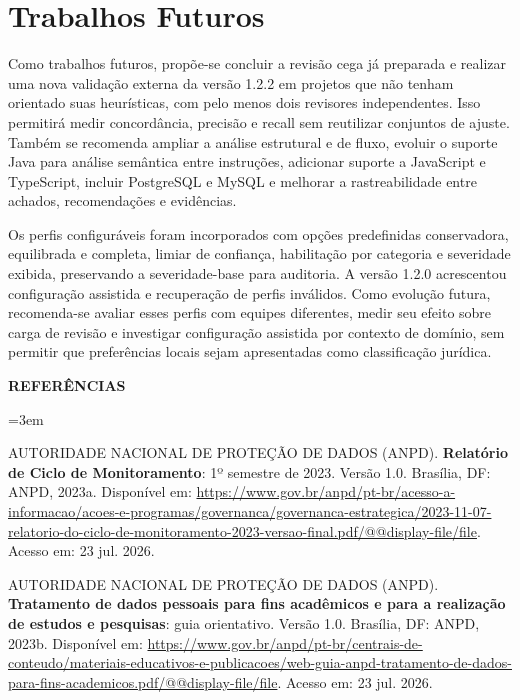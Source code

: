 \documentclass[12pt,a4paper,oneside]{report}
\newcommand{\tituloref}[1]{\textbf{#1}}
\begin{document}
\section{Trabalhos Futuros}

Como trabalhos futuros, propõe-se concluir a revisão cega já preparada e realizar uma nova validação externa da versão 1.2.2 em projetos que não tenham orientado suas heurísticas, com pelo menos dois revisores independentes. Isso permitirá medir concordância, precisão e recall sem reutilizar conjuntos de ajuste. Também se recomenda ampliar a análise estrutural e de fluxo, evoluir o suporte Java para análise semântica entre instruções, adicionar suporte a JavaScript e TypeScript, incluir PostgreSQL e MySQL e melhorar a rastreabilidade entre achados, recomendações e evidências.

Os perfis configuráveis foram incorporados com opções predefinidas conservadora, equilibrada e completa, limiar de confiança, habilitação por categoria e severidade exibida, preservando a severidade-base para auditoria. A versão 1.2.0 acrescentou configuração assistida e recuperação de perfis inválidos. Como evolução futura, recomenda-se avaliar esses perfis com equipes diferentes, medir seu efeito sobre carga de revisão e investigar configuração assistida por contexto de domínio, sem permitir que preferências locais sejam apresentadas como classificação jurídica.

\clearpage
{}
\begin{center}
\textbf{REFERÊNCIAS}
\end{center}
\begingroup
{}
\setlength{\parindent}{0pt}
\setlength{\parskip}{\baselineskip}
\RaggedRight
{}
\emergencystretch=3em

AUTORIDADE NACIONAL DE PROTEÇÃO DE DADOS (ANPD). \tituloref{Relatório de Ciclo de Monitoramento}: 1º semestre de 2023. Versão 1.0. Brasília, DF: ANPD, 2023a. Disponível em: \url{https://www.gov.br/anpd/pt-br/acesso-a-informacao/acoes-e-programas/governanca/governanca-estrategica/2023-11-07-relatorio-do-ciclo-de-monitoramento-2023-versao-final.pdf/@@display-file/file}. Acesso em: 23 jul. 2026.

AUTORIDADE NACIONAL DE PROTEÇÃO DE DADOS (ANPD). \tituloref{Tratamento de dados pessoais para fins acadêmicos e para a realização de estudos e pesquisas}: guia orientativo. Versão 1.0. Brasília, DF: ANPD, 2023b. Disponível em: \url{https://www.gov.br/anpd/pt-br/centrais-de-conteudo/materiais-educativos-e-publicacoes/web-guia-anpd-tratamento-de-dados-para-fins-academicos.pdf/@@display-file/file}. Acesso em: 23 jul. 2026.
\end{document}
